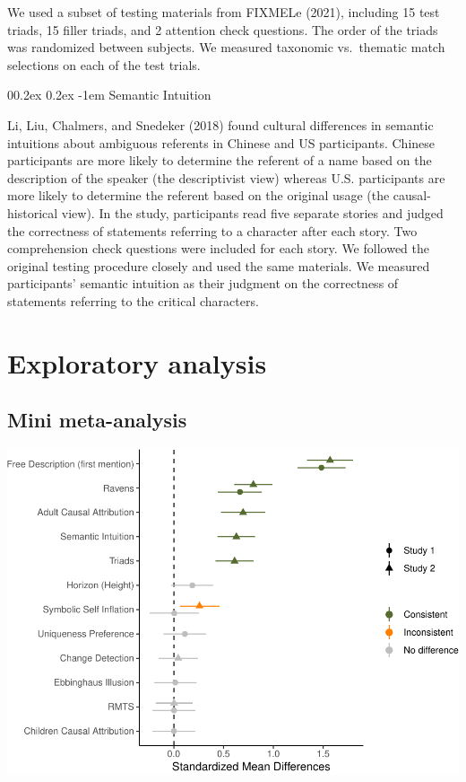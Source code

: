 \documentclass[
  man]{apa6}
\makeatletter
\let\oldparagraph\paragraph
\renewcommand{\paragraph}[1]{\oldparagraph{#1}\mbox{}}
\renewcommand{\paragraph}{\@startsection{paragraph}{4}{\parindent}%
  {0\baselineskip \@plus 0.2ex \@minus 0.2ex}%
  {-1em}%
  {\normalfont\normalsize\bfseries\itshape\typesectitle}}
\makeatother
\begin{document}
We used a subset of testing materials from FIXMELe (2021), including 15 test triads, 15 filler triads, and 2 attention check questions. The order of the triads was randomized between subjects. We measured taxonomic vs.~thematic match selections on each of the test trials.

\hypertarget{semantic-intuition}{%
\paragraph{Semantic Intuition}\label{semantic-intuition}}

Li, Liu, Chalmers, and Snedeker (2018) found cultural differences in semantic intuitions about ambiguous referents in Chinese and US participants. Chinese participants are more likely to determine the referent of a name based on the description of the speaker (the descriptivist view) whereas U.S. participants are more likely to determine the referent based on the original usage (the causal-historical view). In the study, participants read five separate stories and judged the correctness of statements referring to a character after each story. Two comprehension check questions were included for each story. We followed the original testing procedure closely and used the same materials. We measured participants' semantic intuition as their judgment on the correctness of statements referring to the critical characters.

\hypertarget{exploratory-analysis}{%
\section{Exploratory analysis}\label{exploratory-analysis}}

\hypertarget{mini-meta-analysis}{%
\subsection{Mini meta-analysis}\label{mini-meta-analysis}}

\includegraphics{CCRR_manuscript_files/figure-latex/unnamed-chunk-15-1.pdf}
\end{document}
